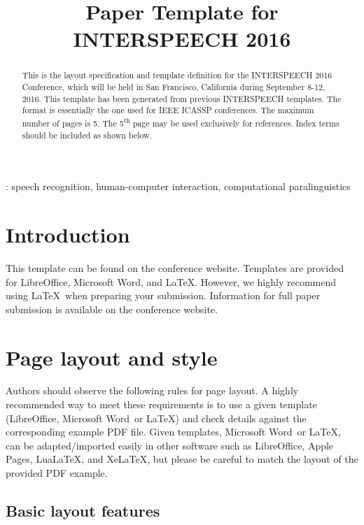 \documentclass[a4paper]{article}
\title{Paper Template for INTERSPEECH 2016}
\begin{document}
  \maketitle
  \begin{abstract}
    This is the layout specification and template definition for the INTERSPEECH 2016 Conference, which will be held in San Francisco, California during September 8-12, 2016.
    This template has been generated from previous INTERSPEECH templates. 
    The format is essentially the one used for IEEE ICASSP conferences. 
    The maximum number of pages is 5. 
    The 5\textsuperscript{th} page may be used exclusively for references. 
    Index terms should be included as shown below.
  \end{abstract}
  : speech recognition, human-computer interaction, computational paralinguistics



  \section{Introduction}

    This template can be found on the conference website.
    Templates are provided for LibreOffice, Microsoft Word\textregistered, and \LaTeX.
    However, we highly recommend using \LaTeX\ when preparing your submission.     
    Information for full paper submission is available on the conference website.

  
  \section{Page layout and style}

    Authors should observe the following rules for page layout. 
    A highly recommended way to meet these requirements is to use a given template (LibreOffice, Microsoft Word\textregistered\ or \LaTeX) and check details against the corresponding example PDF file.
    Given templates, Microsoft Word\textregistered\ or \LaTeX, can be adapted/imported easily in other software such as LibreOffice, Apple Pages, Lua\LaTeX, and Xe\LaTeX, but please be careful to match the layout of the provided PDF example.  
    \subsection{Basic layout features}
\end{document}
